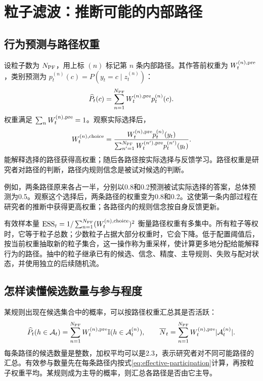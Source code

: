 \documentclass[12pt]{article}
\newcommand{\ind}{\mathbb I}
\begin{document}
\section{粒子滤波：推断可能的内部路径}
\label{sec:pf}

\subsection{行为预测与路径权重}

设粒子数为 $N_{\rm PF}$，用上标 $(n)$ 标记第 $n$ 条内部路径。其作答前权重为 $W_t^{(n),{\rm pre}}$，类别预测为 $p_t^{(n)}(c)=P(y_t=c\mid z_t^{(n)})$：
\begin{equation}
\widehat P_t(c)=\sum_{n=1}^{N_{\rm PF}}W_t^{(n),{\rm pre}}p_t^{(n)}(c).
\label{eq:pf-prediction}
\end{equation}
权重满足 $\sum_n W_t^{(n),{\rm pre}}=1$。观察实际选择后，
\begin{equation}
W_t^{(n),{\rm choice}}=\frac{W_t^{(n),{\rm pre}}p_t^{(n)}(y_t)}{\sum_{n'=1}^{N_{\rm PF}}W_t^{(n'),{\rm pre}}p_t^{(n')}(y_t)}.
\end{equation}
能解释选择的路径获得高权重；随后各路径按实际选择与反馈学习。路径权重是研究者对路径的判断，路径内规则信念是被试对候选的判断。

例如，两条路径原来各占一半，分别以0.8和0.2预测被试实际选择的答案，总体预测为0.5。观察这个选择后，两条路径的权重变为0.8和0.2。这使第一条内部过程在研究者的推断中获得更高权重；各路径内的规则信念按自身反馈更新。

有效样本量 $\mathrm{ESS}_t=1/\sum_{n=1}^{N_{\rm PF}}(W_t^{(n),{\rm choice}})^2$ 衡量路径权重有多集中。所有粒子等权时，它等于粒子总数；少数粒子占据大部分权重时，它会下降。低于配置阈值后，按当前权重抽取新的粒子集合，这一操作称为重采样，使计算更多地分配给能解释行为的路径。抽中的粒子继承已有的候选、信念、精度、主导规则、失败与配对状态，并使用独立的后续随机流。

\subsection{怎样读懂候选数量与参与程度}

某规则出现在候选集合中的概率，可以按路径权重汇总其是否活跃：
\begin{equation}
\widehat P_t(h\in \mathcal A_t)=\sum_{n=1}^{N_{\rm PF}}W_t^{(n),{\rm pre}}\ind(h\in \mathcal A_t^{(n)}),
\qquad
\overline N_t=\sum_{n=1}^{N_{\rm PF}}W_t^{(n),{\rm pre}}|\mathcal A_t^{(n)}|.
\end{equation}
每条路径的候选数量是整数，加权平均可以是2.3，表示研究者对不同可能路径的汇总。有效参与数量先在每条路径内按式\eqref{eq:effective-participation}计算，再按粒子权重平均。某规则成为主导的概率，则汇总各路径是否由它主导。
\end{document}
